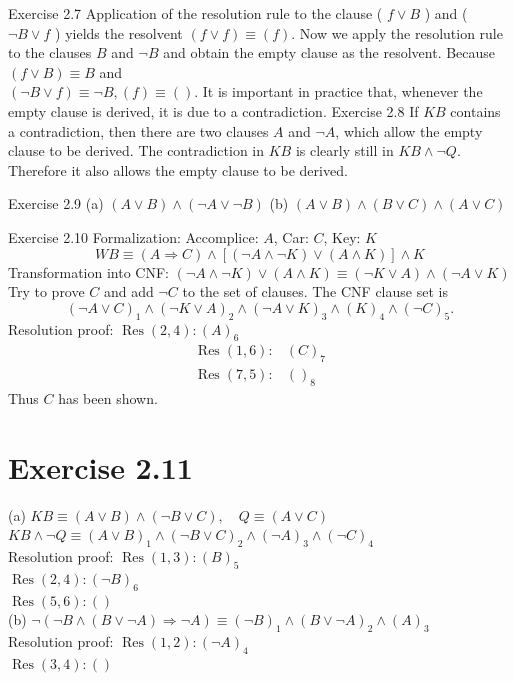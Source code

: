 \documentclass[10pt]{book}
\begin{document}
Exercise 2.7 Application of the resolution rule to the clause ( $f \vee B$ ) and ( $\neg B \vee f$ ) yields the resolvent $(f \vee f) \equiv(f)$. Now we apply the resolution rule to the clauses $B$ and $\neg B$ and obtain the empty clause as the resolvent. Because $(f \vee B) \equiv B$ and\\
$(\neg B \vee f) \equiv \neg B,(f) \equiv()$. It is important in practice that, whenever the empty clause is derived, it is due to a contradiction.
Exercise 2.8 If $KB$ contains a contradiction, then there are two clauses $A$ and $\neg A$, which allow the empty clause to be derived. The contradiction in $KB$ is clearly still in $KB \wedge \neg Q$. Therefore it also allows the empty clause to be derived.

Exercise 2.9 (a) $(A \vee B) \wedge (\neg A \vee \neg B)$ (b) $(A \vee B) \wedge (B \vee C) \wedge (A \vee C)$

Exercise 2.10 Formalization: Accomplice: $A$, Car: $C$, Key: $K$
$$
WB \equiv (A \Rightarrow C) \wedge [(\neg A \wedge \neg K) \vee (A \wedge K)] \wedge K
$$
Transformation into CNF: $(\neg A \wedge \neg K) \vee (A \wedge K) \equiv (\neg K \vee A) \wedge (\neg A \vee K)$\\
Try to prove $C$ and add $\neg C$ to the set of clauses. The CNF clause set is
$$
(\neg A \vee C)_{1} \wedge (\neg K \vee A)_{2} \wedge (\neg A \vee K)_{3} \wedge (K)_{4} \wedge (\neg C)_{5}.
$$
Resolution proof: $\operatorname{Res}(2,4):(A)_{6}$
$$
\begin{array}{ll}
\operatorname{Res}(1,6): & (C)_{7} \\
\operatorname{Res}(7,5): & ()_{8}
\end{array}
$$
Thus $C$ has been shown.

\section{Exercise 2.11}
(a) $KB \equiv (A \vee B) \wedge (\neg B \vee C),\quad Q \equiv (A \vee C)$\\
$KB \wedge \neg Q \equiv (A \vee B)_{1} \wedge (\neg B \vee C)_{2} \wedge (\neg A)_{3} \wedge (\neg C)_{4}$\\
Resolution proof: $\operatorname{Res}(1,3):(B)_{5}$\\
$\operatorname{Res}(2,4):(\neg B)_{6}$\\
$\operatorname{Res}(5,6):()$\\
(b) $\neg(\neg B \wedge (B \vee \neg A) \Rightarrow \neg A) \equiv (\neg B)_{1} \wedge (B \vee \neg A)_{2} \wedge (A)_{3}$\\
Resolution proof: $\operatorname{Res}(1,2):(\neg A)_{4}$\\
$\operatorname{Res}(3,4):()$
\end{document}
